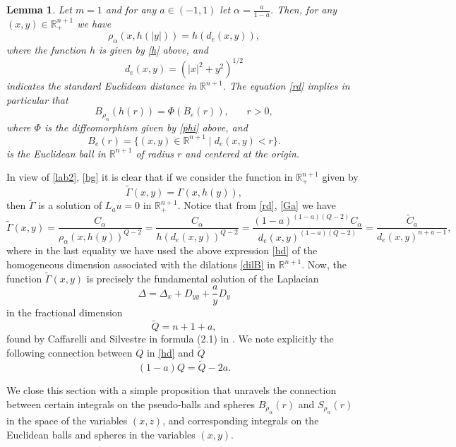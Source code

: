 \documentclass[11pt]{amsart}
\theoremstyle{plain}
\newtheorem{lemma}[thrm]{Lemma}
\numberwithin{equation}{section}
\begin{document}
\begin{lemma}\label{L:rhod}
Let $m=1$ and for any $a\in (-1,1)$ let $\alpha = \frac{a}{1-a}$. Then, for any $(x,y)\in {{\mathbb R}^{n+1}_+}$ we have
\begin{equation}\label{rd}
\rho_\alpha(x,h(|y|)) = h(d_e(x,y)),
\end{equation}
where the function $h$ is given by \eqref{h} above, and
\[d_e(x,y) = (|x|^2 + y^2)^{1/2}\]
indicates the standard Euclidean distance in ${\mathbb R}^{n+1}$. The equation \eqref{rd} implies in particular that
\begin{equation}\label{balls}
B_{\rho_\alpha}(h(r)) = \Phi(B_e(r)),\ \ \ \ \ \ \ \ r>0,
\end{equation}
where $\Phi$ is the diffeomorphism given by \eqref{phi} above, and
\[B_e(r) = \{(x,y)\in {\mathbb R}^{n+1}\mid d_e(x,y)<r\}.\]
is the Euclidean ball in ${\mathbb R}^{n+1}$ of radius $r$ and centered at the origin.
\end{lemma}

In view of \eqref{lab2}, \eqref{bg} it is clear that if we consider the function in ${{\mathbb R}^{n+1}_+}$ given by
\[
\tilde \Gamma(x,y) = \Gamma(x,h(y)),
\]
then $\tilde \Gamma$ is a solution of $L_a u = 0$ in ${{\mathbb R}^{n+1}_+}$. Notice that from \eqref{rd}, \eqref{Ga} we have
\[
\tilde \Gamma(x,y) = \frac{C_{\alpha}}{{\rho_\alpha}(x,h(y))^{Q-2}} = \frac{C_{\alpha}}{h(d_e(x,y))^{Q-2}} = \frac{(1-a)^{(1-a)(Q-2)}C_{\alpha}}{d_e(x,y)^{(1-a)(Q-2)}} = \frac{\tilde C_a}{d_e(x,y)^{n+a-1}},
\]
where in the last equality we have used the above expression \eqref{hd} of the homogeneous dimension associated with the dilations \eqref{dilB} in ${\mathbb R}^{n+1}$. Now, the function $\tilde \Gamma(x,y)$ is precisely the fundamental solution of the Laplacian
\[
\Delta = \Delta_x + D_{yy} + \frac{a}{y} D_y
\]
in the fractional dimension
\begin{equation}\label{tQ}
\tilde Q = n+1+a,
\end{equation}
 found by Caffarelli and Silvestre in formula (2.1) in \cite{CS}. We note explicitly the following connection between $Q$ in \eqref{hd} and $\tilde Q$
 \begin{equation}\label{QtQ}
 (1-a)Q = \tilde Q - 2a.
 \end{equation}

We close this section with a simple proposition that unravels the connection between certain integrals on the pseudo-balls and spheres  $B_{\rho_\alpha}(r)$ and $S_{\rho_\alpha}(r)$ in the space of the variables $(x,z)$, and corresponding integrals on the Euclidean balls and spheres in the variables $(x,y)$.
\end{document}
